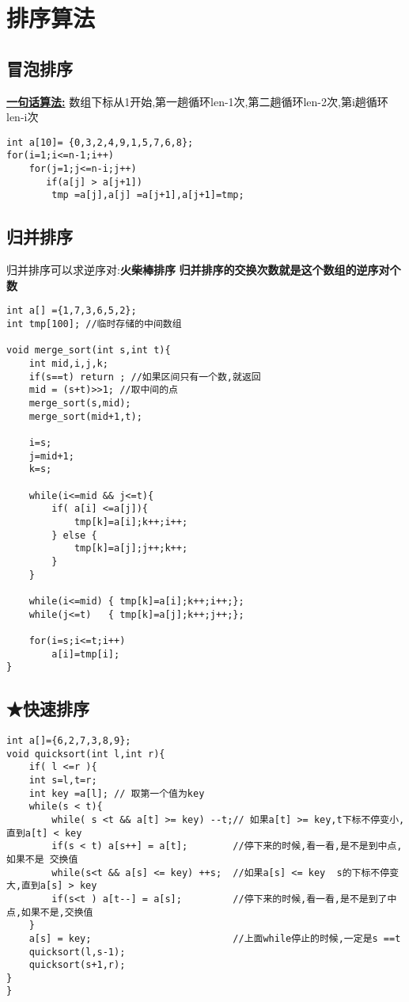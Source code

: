 \section{排序算法}

\subsection{冒泡排序}

\textbf{\underline{一句话算法:}} 数组下标从1开始,第一趟循环len-1次,第二趟循环len-2次,第i趟循环len-i次 

\begin{lstlisting}
int a[10]= {0,3,2,4,9,1,5,7,6,8};
for(i=1;i<=n-1;i++)
    for(j=1;j<=n-i;j++)
       if(a[j] > a[j+1])   
        tmp =a[j],a[j] =a[j+1],a[j+1]=tmp;
\end{lstlisting}

\subsection{归并排序}

归并排序可以求逆序对:\textbf{火柴棒排序}
\textbf{归并排序的交换次数就是这个数组的逆序对个数}

\begin{lstlisting}
int a[] ={1,7,3,6,5,2};
int tmp[100]; //临时存储的中间数组

void merge_sort(int s,int t){
    int mid,i,j,k;
    if(s==t) return ; //如果区间只有一个数,就返回
    mid = (s+t)>>1; //取中间的点
    merge_sort(s,mid);
    merge_sort(mid+1,t);

    i=s;
    j=mid+1;
    k=s;

    while(i<=mid && j<=t){
        if( a[i] <=a[j]){
            tmp[k]=a[i];k++;i++;
        } else {
            tmp[k]=a[j];j++;k++;
        }
    }

    while(i<=mid) { tmp[k]=a[i];k++;i++;};
    while(j<=t)   { tmp[k]=a[j];k++;j++;};

    for(i=s;i<=t;i++)
        a[i]=tmp[i];
}
\end{lstlisting}



\subsection{★快速排序}

\begin{lstlisting}
int a[]={6,2,7,3,8,9};
void quicksort(int l,int r){
    if( l <=r ){
    int s=l,t=r;
    int key =a[l]; // 取第一个值为key
    while(s < t){
        while( s <t && a[t] >= key) --t;// 如果a[t] >= key,t下标不停变小,直到a[t] < key
        if(s < t) a[s++] = a[t];        //停下来的时候,看一看,是不是到中点,如果不是 交换值
        while(s<t && a[s] <= key) ++s;  //如果a[s] <= key  s的下标不停变大,直到a[s] > key
        if(s<t ) a[t--] = a[s];         //停下来的时候,看一看,是不是到了中点,如果不是,交换值
    }
    a[s] = key;                         //上面while停止的时候,一定是s ==t
    quicksort(l,s-1);
    quicksort(s+1,r);
}
}
\end{lstlisting}